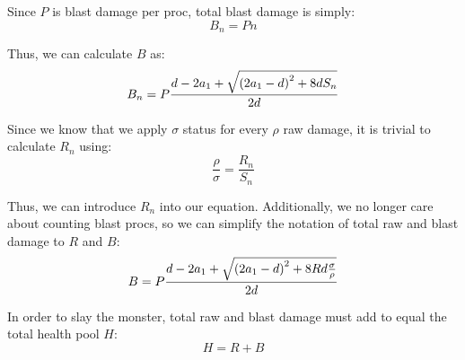 \documentclass{article}
\begin{document}
Since $P$ is blast damage per proc, total blast damage is simply:
\begin{equation}
    B_n = Pn
\end{equation}

Thus, we can calculate $B$ as:
\begin{equation}
    B_n = P \frac{d - 2 a_1 + \sqrt{\parens*{2 a_1 - d}^2 + 8 d S_n}}{2 d}
\end{equation}

Since we know that we apply $\sigma$ status for every $\rho$ raw damage, it is trivial to calculate $R_n$ using:
\begin{equation}
    \frac{\rho}{\sigma} = \frac{R_n}{S_n}
    \label{eq:rs_ratio}
\end{equation}

Thus, we can introduce $R_n$ into our equation. Additionally, we no longer care about counting blast procs, so we can simplify the notation of total raw and blast damage to $R$ and $B$:
\begin{equation}
    B = P \frac{d - 2 a_1 + \sqrt{\parens*{2 a_1 - d}^2 + 8 R d \frac{\sigma}{\rho} }}{2 d}
\end{equation}

In order to slay the monster, total raw and blast damage must add to equal the total health pool $H$:
\begin{equation}
    H = R + B
    \label{eq:h_eq_r_b}
\end{equation}
\end{document}
